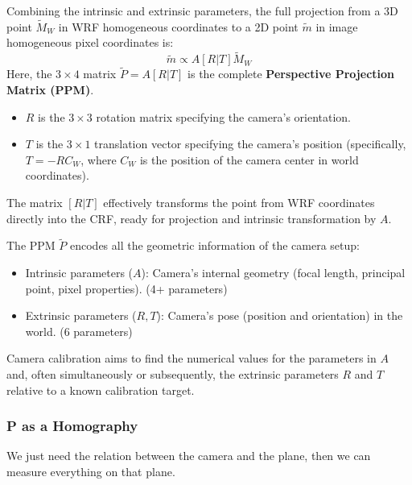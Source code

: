 Combining the intrinsic and extrinsic parameters, the full projection from a 3D point $\tilde{M}_W$ in WRF homogeneous coordinates to a 2D point $\tilde{m}$ in image homogeneous pixel coordinates is:
\[
\tilde{m} \propto A [R | T] \tilde{M}_W
\]
Here, the $3 \times 4$ matrix $\tilde{P} = A[R|T]$ is the complete \textbf{Perspective Projection Matrix (PPM)}.
\begin{itemize}
    \item $R$ is the $3 \times 3$ rotation matrix specifying the camera's orientation.
    \item $T$ is the $3 \times 1$ translation vector specifying the camera's position (specifically, $T = -RC_W$, where $C_W$ is the position of the camera center in world coordinates).
\end{itemize}
The matrix $[R|T]$ effectively transforms the point from WRF coordinates directly into the CRF, ready for projection and intrinsic transformation by $A$.

The PPM $\tilde{P}$ encodes all the geometric information of the camera setup:
\begin{itemize}
    \item Intrinsic parameters ($A$): Camera's internal geometry (focal length, principal point, pixel properties). (4+ parameters)
    \item Extrinsic parameters ($R, T$): Camera's pose (position and orientation) in the world. (6 parameters)
\end{itemize}
Camera calibration aims to find the numerical values for the parameters in $A$ and, often simultaneously or subsequently, the extrinsic parameters $R$ and $T$ relative to a known calibration target.

\subsubsection{P as a Homography}
We just need the relation between the camera and the plane, then we can measure everything on that plane.

